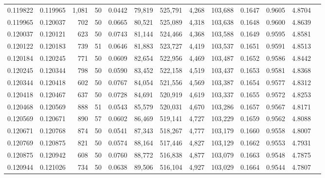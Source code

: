 \begin{tabular}{rrrrrrrrrrrrr}
0.119822 & 0.119965 & 1,081 &  50 &                                     0.0442 &  79,819 & 525,791 &   4,268 & 103,688 & 0.1647 & 0.9605 & 4.8704 \\
0.119965 & 0.120037 &   702 &  50 &                                     0.0665 &  80,521 & 525,089 &   4,318 & 103,638 & 0.1648 & 0.9600 & 4.8639 \\
0.120037 & 0.120121 &   623 &  50 &                                     0.0743 &  81,144 & 524,466 &   4,368 & 103,588 & 0.1649 & 0.9595 & 4.8581 \\
0.120122 & 0.120183 &   739 &  51 &                                     0.0646 &  81,883 & 523,727 &   4,419 & 103,537 & 0.1651 & 0.9591 & 4.8513 \\
0.120184 & 0.120245 &   771 &  50 &                                     0.0609 &  82,654 & 522,956 &   4,469 & 103,487 & 0.1652 & 0.9586 & 4.8442 \\
0.120245 & 0.120344 &   798 &  50 &                                     0.0590 &  83,452 & 522,158 &   4,519 & 103,437 & 0.1653 & 0.9581 & 4.8368 \\
0.120344 & 0.120418 &   602 &  50 &                                     0.0767 &  84,054 & 521,556 &   4,569 & 103,387 & 0.1654 & 0.9577 & 4.8312 \\
0.120418 & 0.120467 &   637 &  50 &                                     0.0728 &  84,691 & 520,919 &   4,619 & 103,337 & 0.1655 & 0.9572 & 4.8253 \\
0.120468 & 0.120569 &   888 &  51 &                                     0.0543 &  85,579 & 520,031 &   4,670 & 103,286 & 0.1657 & 0.9567 & 4.8171 \\
0.120569 & 0.120671 &   890 &  57 &                                     0.0602 &  86,469 & 519,141 &   4,727 & 103,229 & 0.1659 & 0.9562 & 4.8088 \\
0.120671 & 0.120768 &   874 &  50 &                                     0.0541 &  87,343 & 518,267 &   4,777 & 103,179 & 0.1660 & 0.9558 & 4.8007 \\
0.120769 & 0.120875 &   821 &  50 &                                     0.0574 &  88,164 & 517,446 &   4,827 & 103,129 & 0.1662 & 0.9553 & 4.7931 \\
0.120875 & 0.120942 &   608 &  50 &                                     0.0760 &  88,772 & 516,838 &   4,877 & 103,079 & 0.1663 & 0.9548 & 4.7875 \\
0.120944 & 0.121026 &   734 &  50 &                                     0.0638 &  89,506 & 516,104 &   4,927 & 103,029 & 0.1664 & 0.9544 & 4.7807 \\

\end{tabular}
